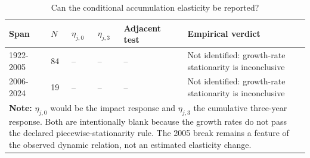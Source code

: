 \begin{table}[h!]
\centering\small
\caption{Can the conditional accumulation elasticity be reported?}
\label{tab:eta}
\begin{tabular}{p{2.0cm}p{0.8cm}p{1.5cm}p{1.8cm}p{2.0cm}p{4.7cm}}
\toprule
\textbf{Span} & \textbf{$N$} & \textbf{$\eta_{j,0}$} & \textbf{$\eta_{j,3}$} & \textbf{Adjacent test} & \textbf{Empirical verdict}\\
\midrule
1922-2005 & 84 & -- & -- & -- & Not identified: growth-rate stationarity is inconclusive \\
2006-2024 & 19 & -- & -- & -- & Not identified: growth-rate stationarity is inconclusive \\
\bottomrule
\multicolumn{6}{p{13.1cm}}{\footnotesize \textbf{Note:} $\eta_{j,0}$ would be the impact response and $\eta_{j,3}$ the cumulative three-year response. Both are intentionally blank because the growth rates do not pass the declared piecewise-stationarity rule. The 2005 break remains a feature of the observed dynamic relation, not an estimated elasticity change.}
\end{tabular}
\end{table}
